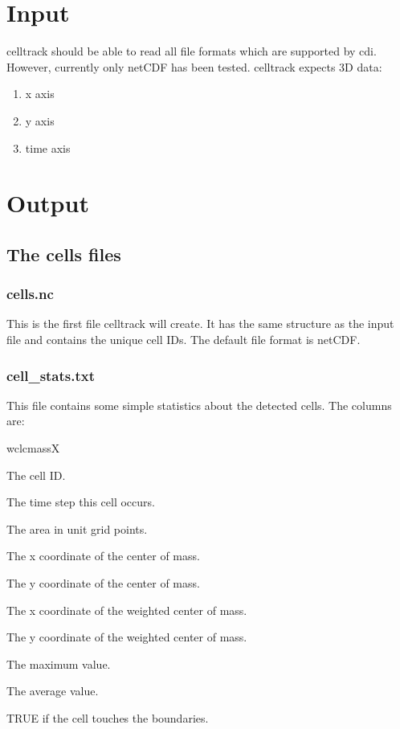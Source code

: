 \documentclass{scrartcl}
\begin{document}
\section{Input}
celltrack should be able to read all file formats which are supported by cdi. However, currently only netCDF has been tested.
celltrack expects 3D data:
\begin{enumerate}
	\item x axis
	\item y axis
    \item time axis
\end{enumerate}

\section{Output}
\label{sec:output}

\subsection{The cells files}
\subsubsection{cells.nc}
This is the first file celltrack will create. It has the same structure as the input file and contains the unique cell IDs. The default file format is netCDF.

\subsubsection{cell\_stats.txt}
This file contains some simple statistics about the detected cells. The columns are:
\begin{labeling}{wclcmassX}
	\item[clID] The cell ID.
	\item[tsclID] The time step this cell occurs.
	\item[clarea] The area in unit grid points.
	\item[clcmassX] The x coordinate of the center of mass.
	\item[clcmassY] The y coordinate of the center of mass.
	\item[wclcmassX] The x coordinate of the weighted center of mass.
	\item[wclcmassY] The y coordinate of the weighted center of mass.
	\item[peakVal] The maximum value.
	\item[avVal] The average value.
	\item[bound] TRUE if the cell touches the boundaries.
\end{labeling}
\end{document}
